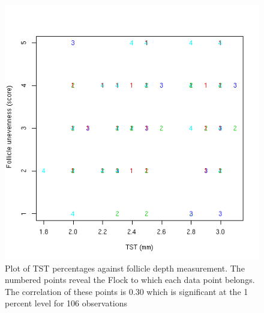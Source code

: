 %

\begin{figure}[!h]
  \centering
  \includegraphics[width=1.0\textwidth]{TSTFu.png}
  \caption{Plot of TST percentages against follicle depth measurement. The numbered points reveal the Flock to which each data point belongs. The correlation of these points is 0.30 which is significant at the 1 percent level for 106 observations}
  \label{fig:TSTFd}
\end{figure}

%

